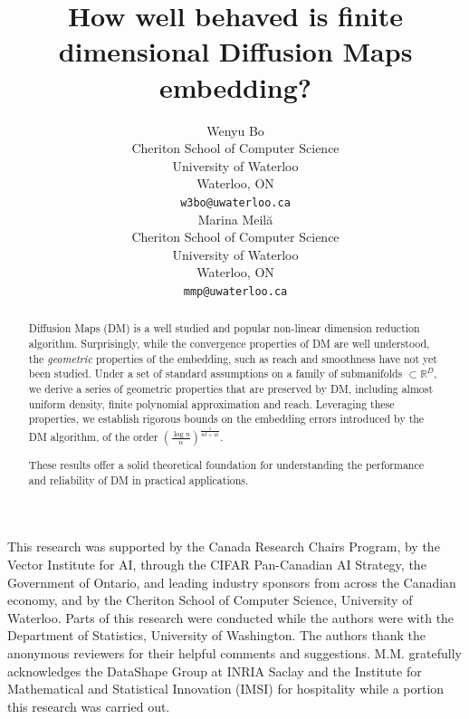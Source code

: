 \documentclass{article}
\title{How well behaved is finite dimensional Diffusion Maps embedding?}
\author{%
  Wenyu Bo \\
    Cheriton School of Computer Science\\
    University of Waterloo\\
    Waterloo, ON \\
    \texttt{w3bo@uwaterloo.ca} \\
  \And
  Marina Meil\u{a}  \\
  Cheriton School of Computer Science\\
    University of Waterloo\\
    Waterloo, ON \\
  \texttt{mmp@uwaterloo.ca}
}
\theoremstyle{definition}
\newcommand{\R}{\mathbb{R}}
\begin{document}


\maketitle

\begin{abstract}
  	Diffusion Maps (DM) is a well studied and popular non-linear dimension reduction algorithm. Surprisingly, while the convergence properties of DM are well understood, the {\em geometric} properties of the embedding, such as reach and smoothness have not yet been studied. Under a set of standard assumptions on a family of submanifolds $\subset \R^D$, we derive a series of geometric properties that are preserved by DM, including almost uniform density, finite polynomial approximation and reach. Leveraging these properties, we establish rigorous bounds on the embedding errors introduced by the DM algorithm, of the order $(\frac{\log n}{n})^{\frac{1}{8d+16}}$. 

    These results offer a solid theoretical foundation for understanding the performance and reliability of DM in practical applications.
\end{abstract}


 



 
 

\begin{ack}
  This research was supported by the Canada Research Chairs Program, by the Vector Institute for AI, through the CIFAR Pan-Canadian AI Strategy, the Government of Ontario, and leading industry sponsors from across the Canadian economy, and by the Cheriton School of Computer Science, University of Waterloo. Parts of this research were conducted while the authors were with the Department of Statistics, University of Washington. The authors thank the anonymous reviewers for their helpful comments and suggestions. M.M. gratefully acknowledges the DataShape Group at INRIA Saclay and the Institute for Mathematical and Statistical Innovation (IMSI) for hospitality while a portion this research was carried out.
\end{ack}
\end{document}
